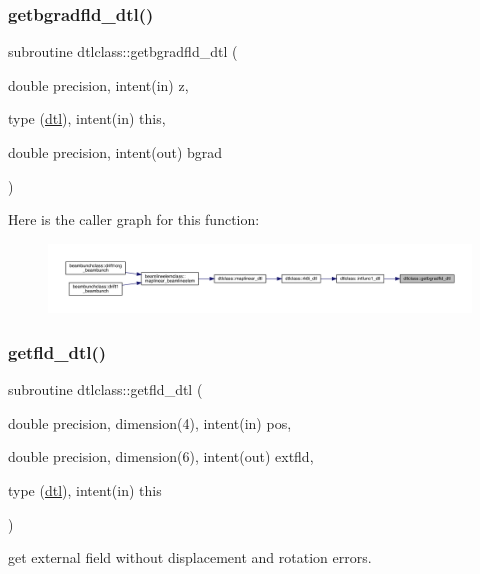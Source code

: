 \subsubsection{\texorpdfstring{getbgradfld\_dtl()}{getbgradfld\_dtl()}}
{\footnotesize\ttfamily subroutine dtlclass\+::getbgradfld\+\_\+dtl (\begin{DoxyParamCaption}\item[{double precision, intent(in)}]{z,  }\item[{type (\mbox{\hyperlink{namespacedtlclass_structdtlclass_1_1dtl}{dtl}}), intent(in)}]{this,  }\item[{double precision, intent(out)}]{bgrad }\end{DoxyParamCaption})}

Here is the caller graph for this function\+:\nopagebreak
\begin{figure}[H]
\begin{center}
\leavevmode
\includegraphics[width=350pt]{namespacedtlclass_a79f0618eb609338c97470f6f8f05a848_icgraph}
\end{center}
\end{figure}
\mbox{\label{namespacedtlclass_a9e97d93c8f7ec49afee134e3ffd3f900}} 
\subsubsection{\texorpdfstring{getfld\_dtl()}{getfld\_dtl()}}
{\footnotesize\ttfamily subroutine dtlclass\+::getfld\+\_\+dtl (\begin{DoxyParamCaption}\item[{double precision, dimension(4), intent(in)}]{pos,  }\item[{double precision, dimension(6), intent(out)}]{extfld,  }\item[{type (\mbox{\hyperlink{namespacedtlclass_structdtlclass_1_1dtl}{dtl}}), intent(in)}]{this }\end{DoxyParamCaption})}



get external field without displacement and rotation errors. 

